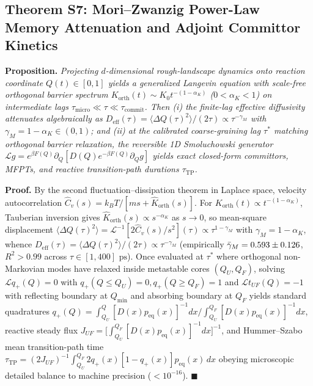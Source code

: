 \documentclass[10pt,letterpaper]{article}
\begin{document}
\subsection{Theorem S7: Mori--Zwanzig Power-Law Memory Attenuation and Adjoint Committor Kinetics}
\textbf{Proposition.} \textit{Projecting $d$-dimensional rough-landscape dynamics onto reaction coordinate $Q(t) \in [0,1]$ yields a generalized Langevin equation with scale-free orthogonal barrier spectrum $K_{\mathrm{orth}}(t) \sim K_0 t^{-(1-\alpha_K)}$ ($0 < \alpha_K < 1$) on intermediate lags $\tau_{\mathrm{micro}} \ll \tau \ll \tau_{\mathrm{commit}}$. Then (i) the finite-lag effective diffusivity attenuates algebraically as $D_{\mathrm{eff}}(\tau) = \langle\Delta Q(\tau)^2\rangle/(2\tau) \propto \tau^{-\gamma_M}$ with $\gamma_M = 1 - \alpha_K \in (0,1)$; and (ii) at the calibrated coarse-graining lag $\tau^*$ matching orthogonal barrier relaxation, the reversible 1D Smoluchowski generator $\mathcal{L}g = e^{\beta F(Q)}\partial_Q[D(Q)e^{-\beta F(Q)}\partial_Q g]$ yields exact closed-form committors, MFPTs, and reactive transition-path durations $\tau_{\mathrm{TP}}$.}

\textbf{Proof.} By the second fluctuation--dissipation theorem in Laplace space, velocity autocorrelation $\hat{C}_v(s) = k_B T / [m s + \hat{K}_{\mathrm{orth}}(s)]$. For $K_{\mathrm{orth}}(t) \propto t^{-(1-\alpha_K)}$, Tauberian inversion gives $\hat{K}_{\mathrm{orth}}(s) \propto s^{-\alpha_K}$ as $s\to 0$, so mean-square displacement $\langle\Delta Q(\tau)^2\rangle = \mathcal{L}^{-1}[2\hat{C}_v(s)/s^2](\tau) \propto \tau^{1-\gamma_M}$ with $\gamma_M = 1-\alpha_K$, whence $D_{\mathrm{eff}}(\tau) = \langle\Delta Q(\tau)^2\rangle/(2\tau) \propto \tau^{-\gamma_M}$ (empirically $\bar{\gamma}_M = 0.593{} \pm 0.126{}$, $R^2 > 0.99$ across $\tau \in [1,400]\text{ ps}$). Once evaluated at $\tau^*$ where orthogonal non-Markovian modes have relaxed inside metastable cores $(Q_U, Q_F)$, solving $\mathcal{L}q_+(Q) = 0$ with $q_+(Q \le Q_U)=0, q_+(Q \ge Q_F)=1$ and $\mathcal{L}t_{UF}(Q) = -1$ with reflecting boundary at $Q_{\min}$ and absorbing boundary at $Q_F$ yields standard quadratures $q_+(Q) = \int_{Q_U}^Q [D(x)p_{\mathrm{eq}}(x)]^{-1}dx \big/ \int_{Q_U}^{Q_F} [D(x)p_{\mathrm{eq}}(x)]^{-1}dx$, reactive steady flux $J_{UF} = \big[\int_{Q_U}^{Q_F} [D(x)p_{\mathrm{eq}}(x)]^{-1}dx\big]^{-1}$, and Hummer--Szabo mean transition-path time $\tau_{\mathrm{TP}} = (2J_{UF})^{-1}\int_{Q_U}^{Q_F} 2q_+(x)[1-q_+(x)]p_{\mathrm{eq}}(x)\,dx$ obeying microscopic detailed balance to machine precision ($<10^{-16}$). $\blacksquare$
\end{document}
